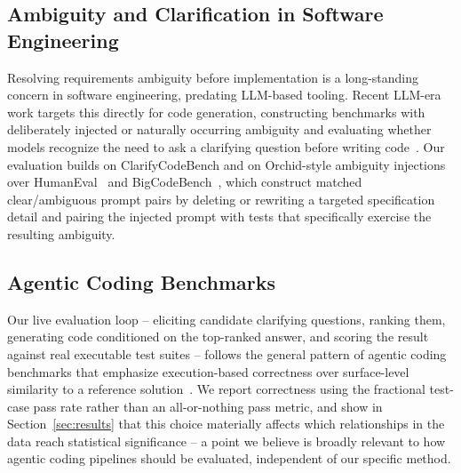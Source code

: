 \subsection{Ambiguity and Clarification in Software Engineering}

Resolving requirements ambiguity before implementation is a long-standing
concern in software engineering, predating LLM-based tooling. Recent
LLM-era work targets this directly for code generation, constructing
benchmarks with deliberately injected or naturally occurring ambiguity and
evaluating whether models recognize the need to ask a clarifying question
before writing code~\cite{clarifycodebench}. Our evaluation builds on
ClarifyCodeBench and on Orchid-style ambiguity injections over
HumanEval~\cite{humaneval} and BigCodeBench~\cite{bigcodebench}, which
construct matched clear/ambiguous prompt pairs by deleting or rewriting a
targeted specification detail and pairing the injected prompt with tests
that specifically exercise the resulting ambiguity.

\subsection{Agentic Coding Benchmarks}

Our live evaluation loop -- eliciting candidate clarifying questions,
ranking them, generating code conditioned on the top-ranked answer, and
scoring the result against real executable test suites -- follows the
general pattern of agentic coding benchmarks that emphasize execution-based
correctness over surface-level similarity to a reference
solution~\cite{humaneval,bigcodebench}. We report correctness using the
fractional test-case pass rate rather than an all-or-nothing pass metric,
and show in Section~\ref{sec:results} that this choice materially affects
which relationships in the data reach statistical significance -- a point
we believe is broadly relevant to how agentic coding pipelines should be
evaluated, independent of our specific method.
